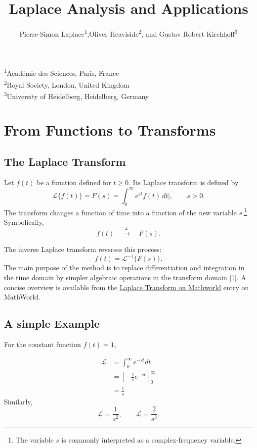 \documentclass{article}
\title{\textbf{Laplace Analysis and Applications}}
\author{
  Pierre-Simon Laplace\textsuperscript{1},Oliver Heaviside\textsuperscript{2}, 
  and Gustav Robert Kirchhoff\textsuperscript{3}
}
\date{}
\begin{document}
\maketitle

\begin{center}
\textsuperscript{1}Acad\'emie des Sciences, Paris, France\\
\textsuperscript{2}Royal Society, London, United Kingdom\\
\textsuperscript{3}University of Heidelberg, Heidelberg, Germany
\end{center}

\section{From Functions to Transforms}
\subsection{The Laplace Transform}

Let $f(t)$ be a function defined for $ t \geq 0$. Its Laplace transform is defined by
\begin{equation}
    \mathcal{L}\{f(t)\}= F(s) = \int_{0}^{\infty} e^{st}f(t) \,dt|,
     \qquad s>0. 
\end{equation}
The transform changes a function of time into a function of the new variable 
$s$.\footnote[1]{The variable $s$ is commonly interpreted as a complex-frequency variable.} Symbolically,
\begin{displaymath}
    f(t) \quad \xrightarrow{\mathcal{L}} \quad F(s).
\end{displaymath}

The inverse Laplace transform reverses this process:
\begin{equation}
    f(t)= \mathcal{L}^{-1}\{F(s)\}.
\end{equation}
The main purpose of the method is to replace differentiation and integration in the time domain
by simpler algebraic operations in the transform domain [1]. A concise overview is available from the \href{https://mathworld.wolfram.com/LaplaceTransform.html}{Laplace Transform on Mathworld} 
entry on MathWorld.
\subsection{A simple Example}

For the constant function $f(t)= 1$,

\begin{align}
    \mathcal{L} &=\int_{0}^{\infty} e^{-st}dt \nonumber \\
    &=\left[- \frac{1}{s}e^{-st}\right]_{0}^{\infty} \nonumber \\
    &= \frac{1}{s}
\end{align}
Similarly,
\begin{equation}
    \mathcal{L}= \frac{1}{s^2}, \qquad \mathcal{L}=\frac{2}{s^3}.
\end{equation}
\newpage
\end{document}
